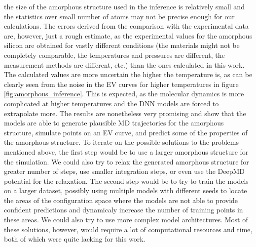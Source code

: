 the size of the amorphous structure used in the inference is relatively small
and the statistics over small number of atoms may not be precise enough for
our calculations.
The errors derived from the comparison with the experimental data are, however, just a rough estimate,
as the experimental values for the amorphous silicon are obtained for vastly
different conditions (the materials might not be completely comparable, the
temperatures and pressures are different, the measurement methods are different, etc.) than the
ones calculated in this work. The calculated values are more uncertain the
higher the temperature is, as can be clearly seen from the noise in the EV
curves for higher temperatures in figure \ref{fig:amorphous_inference}. This
is expected, as the molecular dynamics is more complicated at higher
temperatures and the DNN models are forced to extrapolate more. The results
are nonetheless very promising and show that the models are able to generate
plausible MD trajectories for the amorphous structure, simulate points on an
EV curve, and predict some of the properties of the amorphous structure. To
iterate on the possible solutions to the problems mentioned above, the first
step would be to use a larger amorphous structure for the simulation. We could
also try to relax the generated amorphous structure for greater number of
steps, use smaller integration steps, or even use the DeepMD potential for the
relaxation. The second step would be to try to train the models on a larger
dataset, possibly using multiple models with different seeds to locate the
areas of the configuration space where the models are not able to provide
confident predictions and dynamicaly increase the number of training points in
these areas. We could also try to use more complex model architectures. Most
of these solutions, however, would require a lot of computational resources
and time, both of which were quite lacking for this work.

